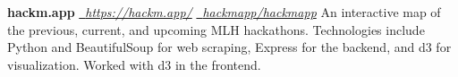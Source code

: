 \documentclass[10pt]{article}
\begin{document}
\begin{minipage}[t]{0.7\textwidth}
\begin{flushleft}
  \vspace{0.25cm}

  \textbf{hackm.app} \hfill \href{https://hackm.app/}{\faLink \, \textit{https://hackm.app/}} \quad \href{https://github.com/hackmapp/hackmapp}{\faGithub \, \textit{hackmapp/hackmapp}} \newline
  An interactive map of the previous, current, and upcoming MLH hackathons. Technologies include Python and BeautifulSoup for web scraping, Express for the backend, and d3 for visualization. Worked with d3 in the frontend.

  \end{flushleft}
\end{minipage}
\end{document}
